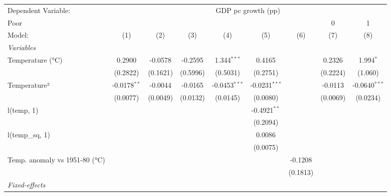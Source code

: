 
\begingroup
\centering
\begin{tabular}{lcccccccc}
   \tabularnewline \midrule \midrule
   Dependent Variable: & \multicolumn{8}{c}{GDP pc growth (pp)}\\
   Poor & \multicolumn{6}{c}{} & 0 & 1 \\ 
   Model:                        & (1)            & (2)      & (3)      & (4)             & (5)             & (6)                   & (7)      & (8)\\  
   \midrule
   \emph{Variables}\\
   Temperature (°C)              & 0.2900         & -0.0578  & -0.2595  & 1.344$^{***}$   & 0.4165          &                       & 0.2326   & 1.994$^{*}$\\   
                                 & (0.2822)       & (0.1621) & (0.5996) & (0.5031)        & (0.2751)        &                       & (0.2224) & (1.060)\\   
   Temperature²                  & -0.0178$^{**}$ & -0.0044  & -0.0165  & -0.0453$^{***}$ & -0.0231$^{***}$ &                       & -0.0113  & -0.0640$^{***}$\\   
                                 & (0.0077)       & (0.0049) & (0.0132) & (0.0145)        & (0.0080)        &                       & (0.0069) & (0.0234)\\   
   l(temp, 1)                    &                &          &          &                 & -0.4921$^{**}$  &                       &          &   \\   
                                 &                &          &          &                 & (0.2094)        &                       &          &   \\   
   l(temp\_sq, 1)                &                &          &          &                 & 0.0086          &                       &          &   \\   
                                 &                &          &          &                 & (0.0075)        &                       &          &   \\   
   Temp. anomaly vs 1951-80 (°C) &                &          &          &                 &                 & -0.1208               &          &   \\   
                                 &                &          &          &                 &                 & (0.1813)              &          &   \\   
   \midrule
   \emph{Fixed-effects}\\

\end{tabular}

